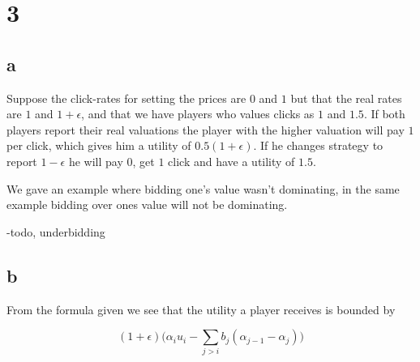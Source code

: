 \section*{3}


\subsection{a}

Suppose the click-rates for setting the prices are $0$ and $1$ but that the real rates are $1$ and $1+\epsilon$, and that we have players who values clicks as $1$ and $1.5$. If both players report their real valuations the player with the higher valuation will pay $1$ per click, which gives him a utility of $0.5(1+\epsilon)$. If he changes strategy to report $1-\epsilon$ he will pay $0$, get $1$ click and have a utility of $1.5$.

We gave an example where bidding one's value wasn't dominating, in the same example bidding over ones value will not be dominating.

-todo, underbidding


\subsection{b}

From the formula given we see that the utility a player receives is bounded by 

$$
(1+\epsilon) \bigg(\alpha_i u_i - \sum_{j>i}b_j (\alpha_{j-1} - \alpha_j) \bigg)
$$


